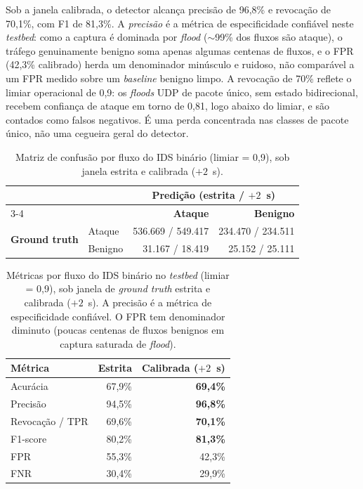 \documentclass[12pt,a4paper]{article}
\begin{document}
Sob a janela calibrada, o detector alcança precisão de 96,8\% e revocação de
70,1\%, com F1 de 81,3\%. A \emph{precisão} é a métrica de especificidade
confiável neste \textit{testbed}: como a captura é dominada por \textit{flood}
($\sim$99\% dos fluxos são ataque), o tráfego genuinamente benigno soma apenas
algumas centenas de fluxos, e o FPR (42,3\% calibrado) herda um denominador
minúsculo e ruidoso, não comparável a um FPR medido sobre um \textit{baseline}
benigno limpo. A revocação de 70\% reflete o limiar operacional de 0,9: os
\textit{floods} UDP de pacote único, sem estado bidirecional, recebem confiança de
ataque em torno de 0,81, logo abaixo do limiar, e são contados como falsos
negativos. É uma perda concentrada nas classes de pacote único, não uma cegueira
geral do detector.

\begin{table}[ht]
\centering
\caption{Matriz de confusão por fluxo do IDS binário (limiar = 0,9), sob janela
estrita e calibrada ($+2$~s).}
\label{tab:bin_cm}
\begin{tabular}{@{}llrr@{}}
\toprule
& & \multicolumn{2}{c}{\textbf{Predição (estrita / \mbox{$+2$~s})}} \\
\cmidrule{3-4}
& & \textbf{Ataque} & \textbf{Benigno} \\ \midrule
\multirow{2}{*}{\textbf{Ground truth}}
  & Ataque  & 536.669 / 549.417 & 234.470 / 234.511 \\
  & Benigno &  31.167 / 18.419 &  25.152 / 25.111 \\ \bottomrule
\end{tabular}
\end{table}

\begin{table}[ht]
\centering
\caption{Métricas por fluxo do IDS binário no \textit{testbed} (limiar = 0,9),
sob janela de \textit{ground truth} estrita e calibrada ($+2$~s). A precisão é a
métrica de especificidade confiável. O FPR tem denominador diminuto (poucas
centenas de fluxos benignos em captura saturada de \textit{flood}).}
\label{tab:bin_metrics}
\begin{tabular}{@{}lrr@{}}
\toprule
\textbf{Métrica} & \textbf{Estrita} & \textbf{Calibrada ($+2$~s)} \\ \midrule
Acurácia            & 67,9\% & \textbf{69,4\%} \\
Precisão            & 94,5\% & \textbf{96,8\%} \\
Revocação / TPR     & 69,6\% & \textbf{70,1\%} \\
F1-score            & 80,2\% & \textbf{81,3\%} \\
FPR                 & 55,3\% & 42,3\% \\
FNR                 & 30,4\% & 29,9\% \\
\bottomrule
\end{tabular}
\end{table}
\end{document}
